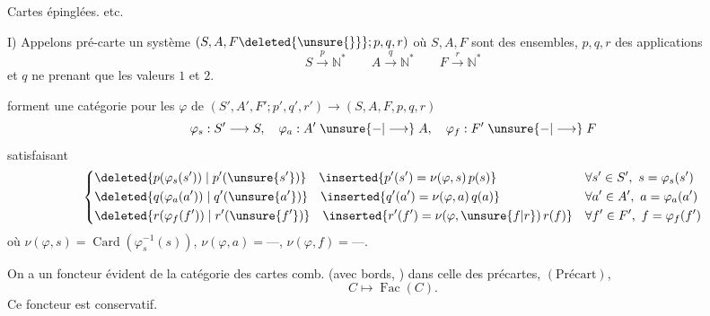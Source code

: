 
Cartes  épinglées. etc.

I) Appelons pré-carte un système $(S,A,F\deleted{\unsure{\}}};p,q,r)$ où $S,A,F$ sont des ensembles, $p,q,r$ des applications
\[
S\xrightarrow{p}\mathbb N^{*}\qquad A\xrightarrow{q}\mathbb N^{*}\qquad F\xrightarrow{r}\mathbb N^{*}
\]
et $q$ ne prenant que les valeurs $1$ et $2$.

 forment une catégorie pour les  $\varphi$ de $(S',A',F';p',q',r')\longrightarrow(S,A,F,p,q,r)$
\[
\varphi_s:S'\longrightarrow S,\quad\varphi_a:A'\;\unsure{-|\longrightarrow}\;A,\quad\varphi_f:F'\;\unsure{-|\longrightarrow}\;F
\]
satisfaisant
\[
\left\{\begin{aligned}
&\deleted{p(\varphi_s(s'))\mid p'(\unsure{s'})}\quad\inserted{p'(s')=\nu(\varphi,s)\,p(s)}
&&\forall s'\in S',\ s=\varphi_s(s')\\
&\deleted{q(\varphi_a(a'))\mid q'(\unsure{a'})}\quad\inserted{q'(a')=\nu(\varphi,a)\,q(a)}
&&\forall a'\in A',\ a=\varphi_a(a')\\
&\deleted{r(\varphi_f(f'))\mid r'(\unsure{f'})}\quad\inserted{r'(f')=\nu(\varphi,\unsure{f|r})\,r(f)}
&&\forall f'\in F',\ f=\varphi_f(f')
\end{aligned}\right.
\]
où $\nu(\varphi,s)=\operatorname{Card}(\varphi_s^{-1}(s))$, $\nu(\varphi,a)=\text{---}$, $\nu(\varphi,f)=\text{---}$.

On a un foncteur évident de la catégorie  des cartes comb. (avec bords,  ) dans celle des précartes, $(\mathrm{Précart})$,
\[
C\longmapsto\operatorname{Fac}(C).
\]
Ce foncteur est conservatif.

